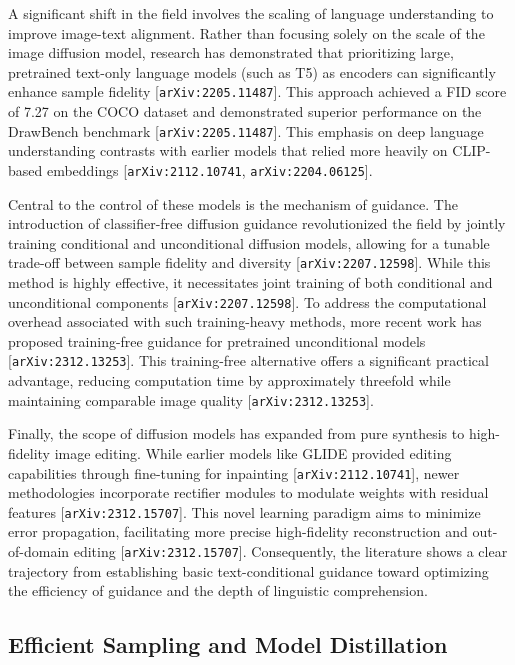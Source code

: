 \documentclass[11pt]{article}
\begin{document}
A significant shift in the field involves the scaling of language understanding to improve image-text alignment. Rather than focusing solely on the scale of the image diffusion model, research has demonstrated that prioritizing large, pretrained text-only language models (such as T5) as encoders can significantly enhance sample fidelity [\texttt{arXiv:2205.11487}]. This approach achieved a FID score of 7.27 on the COCO dataset and demonstrated superior performance on the DrawBench benchmark [\texttt{arXiv:2205.11487}]. This emphasis on deep language understanding contrasts with earlier models that relied more heavily on CLIP-based embeddings [\texttt{arXiv:2112.10741}, \texttt{arXiv:2204.06125}].

Central to the control of these models is the mechanism of guidance. The introduction of classifier-free diffusion guidance revolutionized the field by jointly training conditional and unconditional diffusion models, allowing for a tunable trade-off between sample fidelity and diversity [\texttt{arXiv:2207.12598}]. While this method is highly effective, it necessitates joint training of both conditional and unconditional components [\texttt{arXiv:2207.12598}]. To address the computational overhead associated with such training-heavy methods, more recent work has proposed training-free guidance for pretrained unconditional models [\texttt{arXiv:2312.13253}]. This training-free alternative offers a significant practical advantage, reducing computation time by approximately threefold while maintaining comparable image quality [\texttt{arXiv:2312.13253}].

Finally, the scope of diffusion models has expanded from pure synthesis to high-fidelity image editing. While earlier models like GLIDE provided editing capabilities through fine-tuning for inpainting [\texttt{arXiv:2112.10741}], newer methodologies incorporate rectifier modules to modulate weights with residual features [\texttt{arXiv:2312.15707}]. This novel learning paradigm aims to minimize error propagation, facilitating more precise high-fidelity reconstruction and out-of-domain editing [\texttt{arXiv:2312.15707}]. Consequently, the literature shows a clear trajectory from establishing basic text-conditional guidance toward optimizing the efficiency of guidance and the depth of linguistic comprehension.

\subsection{Efficient Sampling and Model Distillation}
\end{document}
